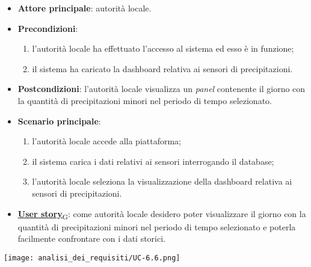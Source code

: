 \begin{itemize}
	\item \textbf{Attore principale}: autorità locale.
	\item \textbf{Precondizioni}:
	      \begin{enumerate}
		      \item l'autorità locale ha effettuato l'accesso al sistema ed esso è in funzione;
		      \item il sistema ha caricato la dashboard relativa ai sensori di precipitazioni.
	      \end{enumerate}
	\item \textbf{Postcondizioni}: l'autorità locale visualizza un \textit{panel} contenente il giorno con la quantità di precipitazioni minori nel periodo di tempo selezionato.
	\item \textbf{Scenario principale}:
	      \begin{enumerate}
		      \item l'autorità locale accede alla piattaforma;
		      \item il sistema carica i dati relativi ai sensori interrogando il database;
		      \item l'autorità locale seleziona la visualizzazione della dashboard relativa ai sensori di precipitazioni.
	      \end{enumerate}
	\item \href{https://7last.github.io/docs/rtb/documentazione-interna/glossario\#user-story}{\textbf{User story}\textsubscript{G}}:
	      come autorità locale desidero poter visualizzare il giorno con la quantità di precipitazioni minori nel periodo di tempo selezionato
	      e poterla facilmente confrontare con i dati storici.
\end{itemize}
\begin{center}
	\texttt{[image: analisi\_dei\_requisiti/UC-6.6.png]}
\end{center}

